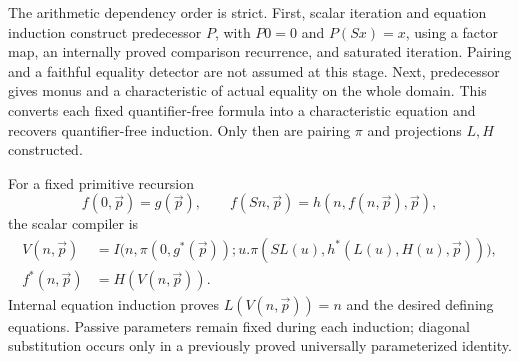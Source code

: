 \documentclass[11pt,letterpaper]{article}
\theoremstyle{definition}\newtheorem{definition}[theorem]{Definition}
\theoremstyle{remark}\newtheorem{remark}[theorem]{Remark}
\begin{document}
The arithmetic dependency order is strict. First, scalar iteration and
equation induction construct predecessor \(P\), with
\(P0=0\) and \(P(Sx)=x\), using a factor map, an internally proved
comparison recurrence, and saturated iteration. Pairing and a faithful
equality detector are not assumed at this stage. Next, predecessor
gives monus and a characteristic of actual equality on the whole domain.
This converts each fixed quantifier-free formula into a characteristic
equation and recovers quantifier-free induction. Only then are pairing
\(\pi\) and projections \(L,H\) constructed.

For a fixed primitive recursion
\[
 f(0,\vec p)=g(\vec p),\qquad
 f(Sn,\vec p)=h(n,f(n,\vec p),\vec p),
\]
the scalar compiler is
\begin{align*}
 V(n,\vec p)&=I\bigl(n,\pi(0,g^*(\vec p));
 u.\pi(SL(u),h^*(L(u),H(u),\vec p))\bigr),\\
 f^*(n,\vec p)&=H(V(n,\vec p)).
\end{align*}
Internal equation induction proves \(L(V(n,\vec p))=n\) and the
desired defining equations. Passive parameters remain fixed during
each induction; diagonal substitution occurs only in a previously
proved universally parameterized identity.
\end{document}
